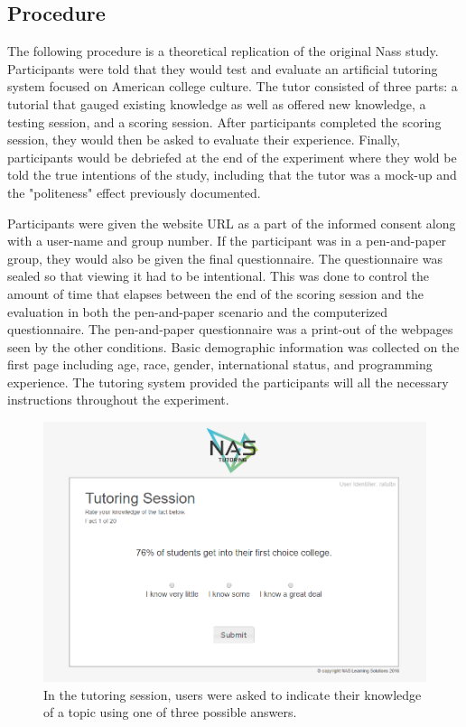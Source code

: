 \documentclass{sig-alternate-05-2015}
\begin{document}
\subsection{Procedure}

The following procedure is a theoretical replication of the original Nass study.   Participants were told that they would test and evaluate an artificial tutoring system focused on American college culture.  The tutor consisted of three parts: a tutorial that gauged existing knowledge as well as offered new knowledge, a testing session, and a scoring session.  After participants completed the scoring session, they would then be asked to evaluate their experience.  Finally, participants would be debriefed at the end of the experiment where they wold be told the true intentions of the study, including that the tutor was a mock-up and the "politeness" effect previously documented.    

Participants were given the website URL as a part of the informed consent along with a user-name and group number.  If the participant was in a pen-and-paper group, they would also be given the final questionnaire.  The questionnaire was sealed so that viewing it had to be intentional.  This was done to control the amount of time that elapses between the end of the scoring session and the evaluation in both the pen-and-paper scenario and the computerized questionnaire.  The pen-and-paper questionnaire was a print-out of the webpages seen by the other conditions.  Basic demographic information was collected on the first page including age, race, gender, international status, and programming experience. The tutoring system provided the participants will all the necessary instructions throughout the experiment.  


\begin{figure}[!h]
    \includegraphics[width=\linewidth]{figures/website/04_tutoring.png}
    \caption{In the tutoring session, users were asked to indicate their knowledge of a topic using one of three possible answers.}
    \label{TutorFigure}
\end{figure}
\end{document}
